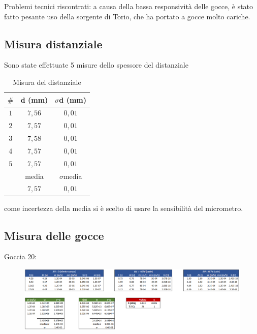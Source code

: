 \documentclass{article}
\begin{document}
\vspace{5mm}

Problemi tecnici riscontrati: a causa della bassa responsività delle gocce, è stato fatto pesante uso della sorgente di Torio, che ha portato a gocce molto cariche. 

\subsection{Misura distanziale}

Sono state effettuate 5 misure dello spessore del distanziale

\begin{table}[h!]
\centering
\begin{tabular}{ | c | c | c | }
  \hline
  $\#$ & d (mm) & $\sigma$d (mm) \\
  \hline
  $1$ & $7,56$ & $0,01$ \\
  $2$ & $7,57$ & $0,01$ \\
  $3$ & $7,58$ & $0,01$ \\
  $4$ & $7,57$ & $0,01$ \\
  $5$ & $7,57$ & $0,01$ \\
  \hline
  & media & $\sigma$media \\
  \hline
  & $7,57$ & $0,01$ \\
  \hline
\end{tabular}
  \caption{Misura del distanziale}
  \label{dist_3}
\end{table}

come incertezza della media si è scelto di usare la sensibilità del micrometro.

\subsection{Misura delle gocce}

Goccia 20:

\begin{figure}[h]
\centering
\includegraphics[width=\linewidth]{Goccia20}
\end{figure}

\pagebreak
\end{document}
